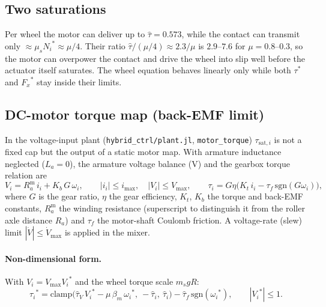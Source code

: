 \documentclass[11pt]{article}
\newcommand{\st}[1]{{#1}^{*}}
\begin{document}
\subsection{Two saturations}
Per wheel the motor can deliver up to $\hat\tau = 0.573$, while the contact can
transmit only $\approx\mu_s\st{N_i}\approx\mu/4$. Their ratio
$\hat\tau/(\mu/4)\approx 2.3/\mu$ is $2.9$--$7.6$ for $\mu = 0.8$--$0.3$, so the
motor can overpower the contact and drive the wheel into slip well before the
actuator itself saturates. The wheel equation behaves linearly only while both
$\st{\tau}$ and $\st{F_x}$ stay inside their limits.

\subsection{DC-motor torque map (back-EMF limit)}
In the voltage-input plant (\texttt{hybrid\_ctrl/plant.jl}, \texttt{motor\_torque})
$\tau_{\mathrm{sat},i}$ is not a fixed cap but the output of a static motor map.
With armature inductance neglected ($L_a = 0$), the armature voltage balance
(V) and the gearbox torque relation are
\begin{equation}
V_i = R_a^{\mathrm{m}}\,i_i + K_b\,G\,\omega_i,\qquad
|i_i| \le i_{\max},\quad |V_i| \le V_{\max},\qquad
\tau_i = G\eta\big(K_t\,i_i - \tau_f\,\mathrm{sgn}(G\omega_i)\big),
\end{equation}
where $G$ is the gear ratio, $\eta$ the gear efficiency, $K_t$, $K_b$ the torque
and back-EMF constants, $R_a^{\mathrm{m}}$ the winding resistance (superscript to
distinguish it from the roller axle distance $R_a$) and $\tau_f$ the motor-shaft
Coulomb friction. A voltage-rate (slew) limit $|\dot V| \le \dot V_{\max}$ is
applied in the mixer.

\paragraph{Non-dimensional form.} With $V_i = V_{\max}\st{V_i}$ and the wheel
torque scale $m_s g R$:
\begin{equation}
\st{\tau_i} = \mathrm{clamp}\Big(\hat\tau_V\,\st{V_i} - \mu\,\beta_m\,\st{\omega_i},\
 -\hat\tau_i,\ \hat\tau_i\Big) - \hat\tau_f\,\mathrm{sgn}(\st{\omega_i}),
\qquad |\st{V_i}| \le 1 .
\end{equation}
\end{document}
